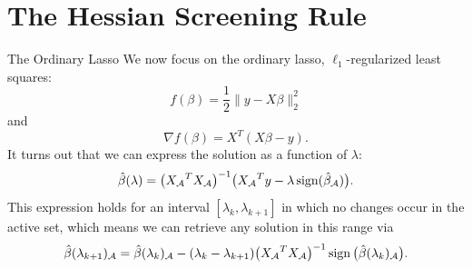 \documentclass[10pt,ignorenonframetext]{beamer}
\begin{document}


\section{The Hessian Screening Rule}

\begin{frame}{The Ordinary Lasso}
  We now focus on the ordinary lasso, \(\ell_1\)-regularized least
  squares:
  \[
    f(\beta) = \frac 1 2 \lVert y - X\beta \rVert_2^2
  \]
  and
  \[
    \nabla f(\beta) = X^T(X\beta - y).
  \]
  \pause
  It turns out that we can express the solution as a function of
  \(\lambda\):
  \begin{equation*}
    \label{eq:solution}
    \hat\beta(\lambda) = \big({X_\mathcal{A}}^TX_\mathcal{A}\big)^{-1}
    \big({X_\mathcal{A}}^Ty - \lambda \operatorname{sign}(\hat\beta_\mathcal{A})\big).
  \end{equation*}
  \pause
  This expression holds for an interval \([\lambda_k,\lambda_{k+1}]\) in which
  no changes occur in the active set, which means we can retrieve any solution
  in this range via
  \begin{equation*}
    \hat\beta(\lambda_{k+1})_\mathcal{A} =
    \hat\beta(\lambda_k)_\mathcal{A} -
    (\lambda_k - \lambda_{k+1})\big({X_\mathcal{A}}^TX_\mathcal{A}\big)^{-1}
    \operatorname{sign}\big(\hat\beta(\lambda_k)_\mathcal{A}\big).
  \end{equation*}
\end{frame}
\end{document}

